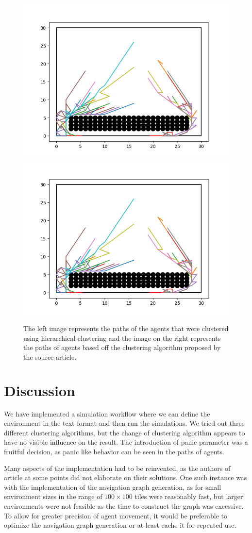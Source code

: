 \documentclass[9pt]{pnas-new}
\begin{document}
\begin{figure}[h!]
    \centering
    \includegraphics[width=0.45\linewidth]{fig/obst_nopanic_newclusters_path_plot.png}
\hfill
    \includegraphics[width=0.45\linewidth]{fig/obst_nopanic_oldclusters_path_plot.png}
    \caption{The left image represents the paths of the agents that were clustered using hierarchical clustering and the image on the right represents the paths of agents based off the clustering algorithm proposed by the source article.}
    \label{fig:enter-label}
\end{figure}

\section{Discussion}
We have implemented a simulation workflow where we can define the environment in the text format and then run the simulations. We tried out three different clustering algorithms, but the change of clustering algorithm appears to have no visible influence on the result. The introduction of panic parameter was a fruitful decision, as panic like behavior can be seen in the paths of agents.

Many aspects of the implementation had to be reinvented, as the authors of article \cite{Wu_Huang_Tian_Yan_Yu_2024} at some points did not elaborate on their solutions. One such instance was with the implementation of the navigation graph generation, as for small environment sizes in the range of $100\times 100$ tiles were reasonably fast, but larger environments were not feasible as the time to construct the graph was excessive. To allow for greater precision of agent movement, it would be preferable to optimize the navigation graph generation or at least cache it for repeated use.
\end{document}
